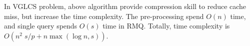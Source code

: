 



In VGLCS problem, above algorithm provide compression skill to reduce
cache miss, but increase the time complexity.  The pre-processing
spend $O(n)$ time, and single query spends $O(s)$ time in RMQ.
Totally, time complexity is $O(n^2 \; s / p + n \max(\log n, s))$.

\iffalse
回到 VGLCS 的應用中，上述算法使用壓縮方式降低快取未中。
我們可以使用上述的算法取代原先的并查集，建表的時間複雜度為 $O(n)$，
單一查詢的時間複雜度為 $O(s)$。
整體的時間複雜度為 $O(n^2 \; s / p + n \max(\log n, s))$。
\fi